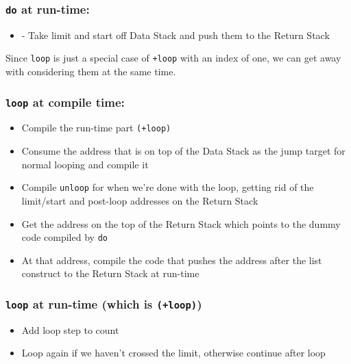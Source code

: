 \subsubsection{\texttt{do} at run-time:}

\begin{itemize}
        \item - Take limit and start off Data Stack and push them to the Return Stack
\end{itemize}

Since \texttt{loop} is just a special case of \texttt{+loop} with an index of
one, we can get away with considering them at the same time. 


\subsubsection{\texttt{loop} at compile time:}

\begin{itemize}

        \item Compile the run-time part \texttt{(+loop)}

        \item Consume the address that is on top of the Data Stack as the jump
                target for normal looping and compile it

        \item Compile \texttt{unloop} for when we're done with the loop, getting
                rid of the limit/start and post-loop addresses on the Return
                Stack 

        \item  Get the address on the top of the Return Stack which points to
                the dummy code compiled by \texttt{do}

        \item At that address, compile the code that pushes the address after
                the list construct to the Return Stack at run-time

\end{itemize}

\subsubsection{\texttt{loop} at run-time (which is \texttt{(+loop)}) }

\begin{itemize}

        \item Add loop step to count

        \item Loop again if we haven't crossed the limit, otherwise continue
                after loop

\end{itemize}

